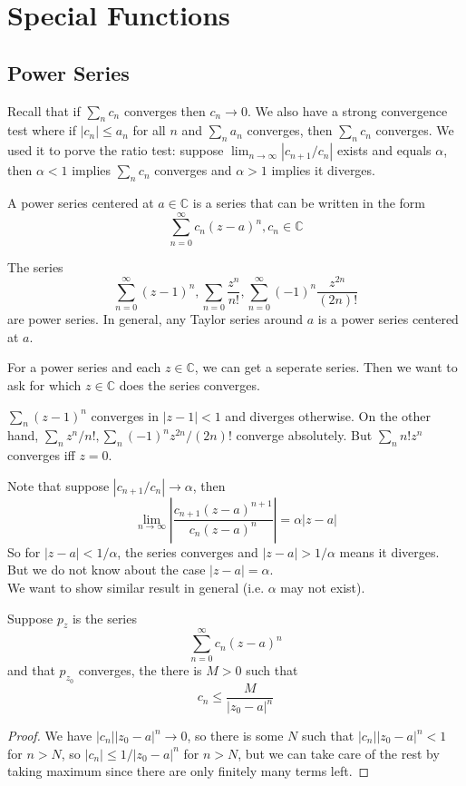\section{Special Functions}
\subsection{Power Series}
Recall that if $\sum_nc_n$ converges then $c_n\to0$.
We also have a strong convergence test where if $|c_n|\le a_n$ for all $n$ and $\sum_na_n$ converges, then $\sum_nc_n$ converges.
We used it to porve the ratio test: suppose $\lim_{n\to\infty}|c_{n+1}/c_n|$ exists and equals $\alpha$, then $\alpha<1$ implies $\sum_nc_n$ converges and $\alpha>1$ implies it diverges.
\begin{definition}
    A power series centered at $a\in\mathbb C$ is a series that can be written in the form
    $$\sum_{n=0}^\infty c_n(z-a)^n,c_n\in\mathbb C$$
\end{definition}
\begin{example}
    The series
    $$\sum_{n=0}^\infty (z-1)^n,\sum_{n=0}\frac{z^n}{n!},\sum_{n=0}^\infty (-1)^n\frac{z^{2n}}{(2n)!}$$
    are power series.
    In general, any Taylor series around $a$ is a power series centered at $a$.
\end{example}
For a power series and each $z\in\mathbb C$, we can get a seperate series.
Then we want to ask for which $z\in\mathbb C$ does the series converges.
\begin{example}
    $\sum_n(z-1)^n$ converges in $|z-1|<1$ and diverges otherwise.
    On the other hand, $\sum_nz^n/n!,\sum_n(-1)^nz^{2n}/(2n)!$ converge absolutely.
    But $\sum_nn!z^n$ converges iff $z=0$.
\end{example}
Note that suppose $|c_{n+1}/c_n|\to\alpha$, then
$$\lim_{n\to\infty}\left|\frac{c_{n+1}(z-a)^{n+1}}{c_n(z-a)^n}\right|=\alpha|z-a|$$
So for $|z-a|<1/\alpha$, the series converges and $|z-a|>1/\alpha$ means it diverges.
But we do not know about the case $|z-a|=\alpha$.\\
We want to show similar result in general (i.e. $\alpha$ may not exist).
\begin{lemma}
    Suppose $p_z$ is the series
    $$\sum_{n=0}^\infty c_n(z-a)^n$$
    and that $p_{z_0}$ converges, the there is $M>0$ such that
    $$c_n\le\frac{M}{|z_0-a|^n}$$
\end{lemma}
\begin{proof}
    We have $|c_n||z_0-a|^n\to 0$, so there is some $N$ such that $|c_n||z_0-a|^n<1$ for $n>N$, so $|c_n|\le 1/|z_0-a|^n$ for $n>N$, but we can take care of the rest by taking maximum since there are only finitely many terms left.
\end{proof}
